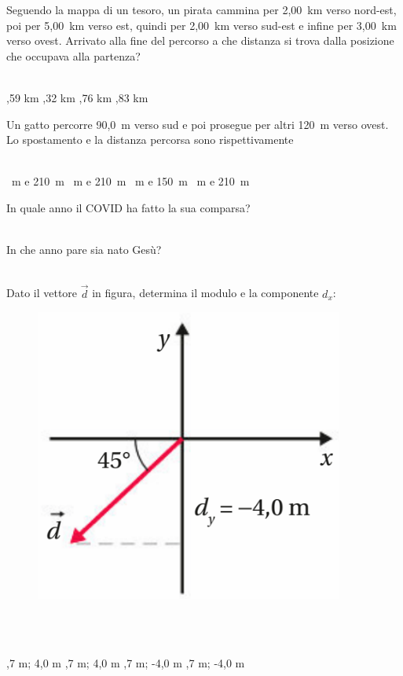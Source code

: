 \documentclass[a4paper,11pt]{exam}
\begin{document}
\begin{questions}

    
\question Seguendo la mappa di un tesoro, un pirata cammina per 2,00~km verso nord-est, poi per 5,00~km verso est, quindi per 2,00~km verso sud-est e infine per 3,00~km verso ovest. Arrivato alla fine del percorso a che distanza si trova dalla posizione che occupava alla partenza?\\\
\begin{oneparchoices}
  ,59 km
  ,32 km
  ,76 km
  \choice 4,83 km
\end{oneparchoices}

    
\question Un gatto percorre 90,0~m verso sud e poi prosegue per altri 120~m verso ovest. Lo spostamento e la distanza percorsa sono rispettivamente\\\
\begin{oneparchoices}
  \choice 30~m e 210~m
  ~m e 210~m
  \choice 210~m e 150~m
  ~m e 210~m
\end{oneparchoices}

    
\question In quale anno il COVID ha fatto la sua comparsa?\\\
\begin{oneparchoices}
  \choice 2019
  \choice 1943
\end{oneparchoices}

    
\question In che anno pare sia nato Gesù?\\\
\begin{oneparchoices}
  \choice -80
  \choice 0
  \choice 20
\end{oneparchoices}

    
\question Dato il vettore $\vec{d}$ in figura, determina il modulo e la componente $d_x$: \begin{figure}[h!]   \begin{center}     \includegraphics[scale=0.35]{vettored.png}   \end{center} \end{figure}\\\
\begin{oneparchoices}
  \choice 5,7 m; 4,0 m
  \choice -5,7 m; 4,0 m
  \choice -5,7 m; -4,0 m
  \choice 5,7 m; -4,0 m
\end{oneparchoices}


\end{questions}
\end{document}
